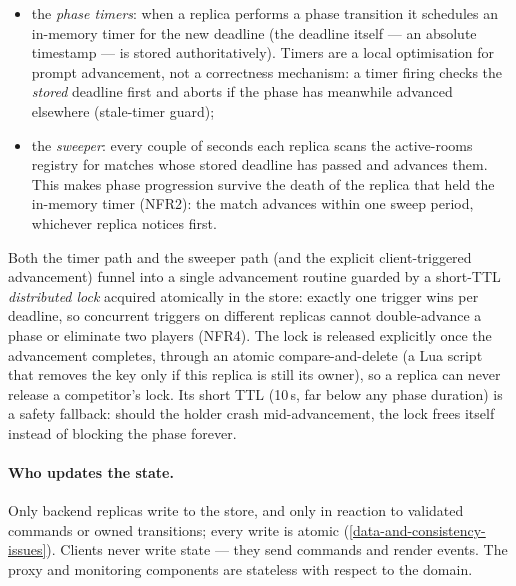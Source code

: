 \documentclass{scrartcl}
\begin{document}
\begin{itemize}
  \item the \emph{phase timers}: when a replica performs a phase
  transition it schedules an in-memory timer for the new deadline (the
  deadline itself --- an absolute timestamp --- is stored authoritatively).
  Timers are a local optimisation for prompt advancement, not a
  correctness mechanism: a timer firing checks the \emph{stored} deadline
  first and aborts if the phase has meanwhile advanced elsewhere
  (stale-timer guard);

  \item the \emph{sweeper}: every couple of seconds each replica scans
  the active-rooms registry for matches whose stored deadline has passed
  and advances them. This makes phase progression survive the death of
  the replica that held the in-memory timer (NFR2): the match advances
  within one sweep period, whichever replica notices first.
\end{itemize}

Both the timer path and the sweeper path (and the explicit
client-triggered advancement) funnel into a single advancement routine
guarded by a short-TTL \emph{distributed lock} acquired atomically in the
store: exactly one trigger wins per deadline, so concurrent triggers on
different replicas cannot double-advance a phase or eliminate two players
(NFR4). The lock is released explicitly once the advancement completes,
through an atomic compare-and-delete (a Lua script that removes the key only
if this replica is still its owner), so a replica can never release a
competitor's lock. Its short TTL (10\,s, far below any phase duration) is a
safety fallback: should the holder crash mid-advancement, the lock frees
itself instead of blocking the phase forever.

\paragraph{Who updates the state.}
Only backend replicas write to the store, and only in reaction to
validated commands or owned transitions; every write is atomic
(\cref{data-and-consistency-issues}). Clients never write state --- they
send commands and render events. The proxy and monitoring components are
stateless with respect to the domain.
\end{document}
